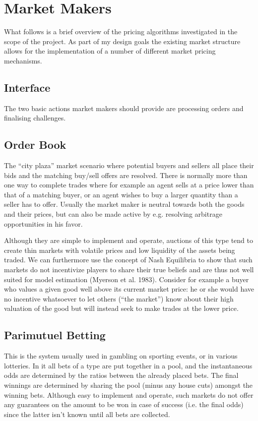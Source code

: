 \documentclass[bsc,frontabs,twoside,singlespacing,parskip,deptreport]{infthesis}     %
\begin{document}
\section{Market Makers}
	What follows is a brief overview of the pricing algorithms investigated in the scope of the project. As part of my design goals the existing market structure allows for the implementation of a number of different market pricing mechanisms. 

\subsection{Interface}
	The two basic actions market makers should provide are processing orders and finalising challenges. 
	
\subsection{Order Book}
	
	The “city plaza” market scenario where potential buyers and sellers all place their bids and the matching buy/sell offers are resolved. There is normally more than one way to complete trades where for example an agent sells at a price lower than that of a matching buyer, or an agent wishes to buy a larger quantity than a seller has to offer. Usually the market maker is neutral towards both the goods and their prices, but can also be made active by e.g. resolving arbitrage opportunities in his favor.

	Although they are simple to implement and operate, auctions of this type tend to create thin markets with volatile prices and low liquidity of the assets being traded. We can furthermore use the concept of Nash Equilibria to show that such markets do not incentivize players to share their true beliefs and are thus not well suited for model estimation (Myerson et al. 1983). Consider for example a buyer who values a given good well above its current market price: he or she would have no incentive whatsoever to let others (“the market”) know about their high valuation of the good but will instead seek to make trades at the lower price.
	
\subsection{Parimutuel Betting}
This is the system usually used in gambling on sporting events, or in various lotteries. In it all bets of a type are put together in a pool, and the instantaneous odds are determined by the ratios between the already placed bets. The final winnings are determined by sharing the pool (minus any house cuts) amongst the winning bets. Although easy to implement and operate, such markets do not offer any guarantees on the amount to be won in case of success (i.e. the final odds) since the latter isn’t known until all bets are collected.
\end{document}
